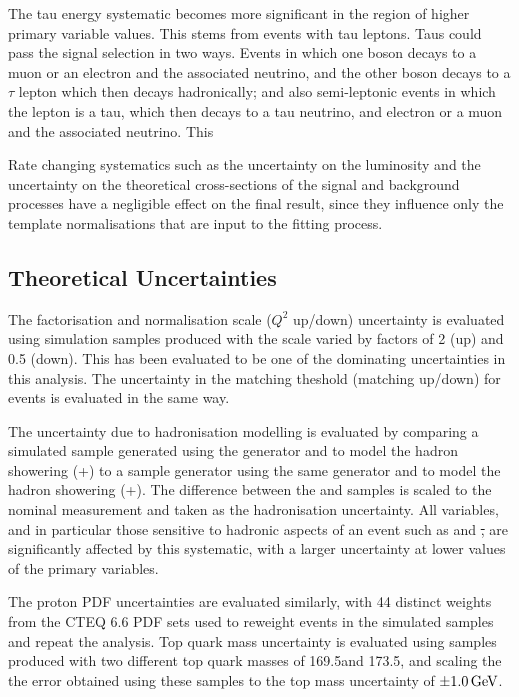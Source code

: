The tau energy systematic becomes more significant in the region of higher primary variable values. This stems
from \ttbar events with tau leptons. Taus could pass the signal selection in two ways. Events in which one \W
boson decays to a muon or an electron and the associated neutrino, and the other \W boson decays to a $\tau$
lepton which then decays hadronically; and also semi-leptonic events in which the lepton is a tau, which then
decays to a tau neutrino, and electron or a muon and the associated neutrino. This 

Rate changing systematics such as the uncertainty on the luminosity and the uncertainty on the theoretical
cross-sections of the signal and background processes have a negligible effect on the final result, since they
influence only the template normalisations that are input to the fitting process.

\subsection{Theoretical Uncertainties}
\label{ss:theoretical_uncertainties}

The factorisation and normalisation scale ($Q^{2}$ up/down) uncertainty is evaluated using simulation samples
produced with the scale varied by factors of 2 (up) and 0.5 (down). This has been evaluated to be one of the
dominating uncertainties in this analysis. The uncertainty in the matching theshold (matching up/down) for
\ttbar events is evaluated in the same way.

The uncertainty due to hadronisation modelling is evaluated by comparing a simulated sample
generated using the \POWHEG generator and \PYTHIA to model the hadron showering (\POWHEG+\PYTHIA) to a sample
generator using the same \POWHEG generator and \HERWIG to model the hadron showering (\POWHEG+\HERWIG). The
difference between the \PYTHIA and \HERWIG samples is scaled to the nominal measurement and taken as the
hadronisation uncertainty. All variables, and in particular those sensitive to hadronic aspects of an event
such as \HT and \st, are significantly affected by this systematic, with a larger uncertainty at lower
values of the primary variables. %

The proton PDF uncertainties are evaluated similarly, with 44 distinct weights from the CTEQ 6.6 PDF sets used
to reweight events in the simulated samples and repeat the analysis.
Top quark mass uncertainty is evaluated using \ttbar samples produced with two different top quark masses of
169.5\GeV and 173.5\GeV, and scaling the the error obtained using these samples to the top mass uncertainty of
$\pm1.0\,\text{Ge\hspace{-.08em}V}$.


